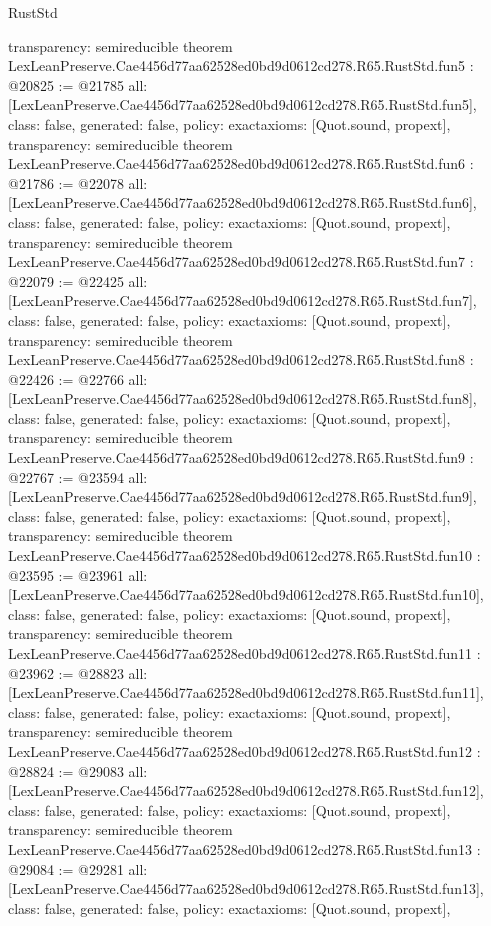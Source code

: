 \begin{lexlean}{RustStd}
\begin{coremodule}
{  transparency: semireducible
}
theorem LexLeanPreserve.Cae4456d77aa62528ed0bd9d0612cd278.R65.RustStd.fun5 : @20825 := @21785 {
  all: [LexLeanPreserve.Cae4456d77aa62528ed0bd9d0612cd278.R65.RustStd.fun5],
  class: false,
  generated: false,
  policy: exact{axioms: [Quot.sound, propext]},
  transparency: semireducible
}
theorem LexLeanPreserve.Cae4456d77aa62528ed0bd9d0612cd278.R65.RustStd.fun6 : @21786 := @22078 {
  all: [LexLeanPreserve.Cae4456d77aa62528ed0bd9d0612cd278.R65.RustStd.fun6],
  class: false,
  generated: false,
  policy: exact{axioms: [Quot.sound, propext]},
  transparency: semireducible
}
theorem LexLeanPreserve.Cae4456d77aa62528ed0bd9d0612cd278.R65.RustStd.fun7 : @22079 := @22425 {
  all: [LexLeanPreserve.Cae4456d77aa62528ed0bd9d0612cd278.R65.RustStd.fun7],
  class: false,
  generated: false,
  policy: exact{axioms: [Quot.sound, propext]},
  transparency: semireducible
}
theorem LexLeanPreserve.Cae4456d77aa62528ed0bd9d0612cd278.R65.RustStd.fun8 : @22426 := @22766 {
  all: [LexLeanPreserve.Cae4456d77aa62528ed0bd9d0612cd278.R65.RustStd.fun8],
  class: false,
  generated: false,
  policy: exact{axioms: [Quot.sound, propext]},
  transparency: semireducible
}
theorem LexLeanPreserve.Cae4456d77aa62528ed0bd9d0612cd278.R65.RustStd.fun9 : @22767 := @23594 {
  all: [LexLeanPreserve.Cae4456d77aa62528ed0bd9d0612cd278.R65.RustStd.fun9],
  class: false,
  generated: false,
  policy: exact{axioms: [Quot.sound, propext]},
  transparency: semireducible
}
theorem LexLeanPreserve.Cae4456d77aa62528ed0bd9d0612cd278.R65.RustStd.fun10 : @23595 := @23961 {
  all: [LexLeanPreserve.Cae4456d77aa62528ed0bd9d0612cd278.R65.RustStd.fun10],
  class: false,
  generated: false,
  policy: exact{axioms: [Quot.sound, propext]},
  transparency: semireducible
}
theorem LexLeanPreserve.Cae4456d77aa62528ed0bd9d0612cd278.R65.RustStd.fun11 : @23962 := @28823 {
  all: [LexLeanPreserve.Cae4456d77aa62528ed0bd9d0612cd278.R65.RustStd.fun11],
  class: false,
  generated: false,
  policy: exact{axioms: [Quot.sound, propext]},
  transparency: semireducible
}
theorem LexLeanPreserve.Cae4456d77aa62528ed0bd9d0612cd278.R65.RustStd.fun12 : @28824 := @29083 {
  all: [LexLeanPreserve.Cae4456d77aa62528ed0bd9d0612cd278.R65.RustStd.fun12],
  class: false,
  generated: false,
  policy: exact{axioms: [Quot.sound, propext]},
  transparency: semireducible
}
theorem LexLeanPreserve.Cae4456d77aa62528ed0bd9d0612cd278.R65.RustStd.fun13 : @29084 := @29281 {
  all: [LexLeanPreserve.Cae4456d77aa62528ed0bd9d0612cd278.R65.RustStd.fun13],
  class: false,
  generated: false,
  policy: exact{axioms: [Quot.sound, propext]},
}
\end{coremodule}
\end{lexlean}
